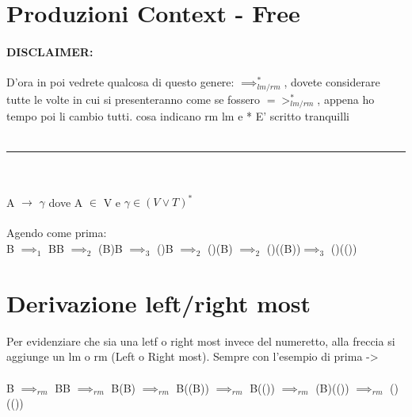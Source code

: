 \documentclass[12pt, a4paper, openany, oneside]{book}
\begin{document}
\section{Produzioni Context - Free}
\paragraph{DISCLAIMER: } D'ora in poi vedrete qualcosa di questo genere: 
$\implies^{*}_{lm/rm}$,
dovete considerare tutte le volte in cui si presenteranno come se fossero 
$=>^{*}_{lm/rm}$, appena ho tempo poi li cambio tutti. cosa indicano rm lm e *
E' scritto tranquilli \\
\\
{\color{black} \rule{\linewidth}{0.3mm}}
\\
\\
A $\to$ $\gamma$ dove A $\in$ V e $\gamma \in (V\vee T)^{*}$ \\ \\
Agendo come prima:	\\
B $\implies _{1}$ BB $\implies _{2}$ (B)B $\implies _{3}$ ()B $\implies _{2}$ 
()(B) $\implies _{2}$ ()((B))$\implies _{3}$ ()(())
\section{Derivazione left/right most}
Per evidenziare che sia una letf o right most invece del numeretto, alla freccia
si aggiunge un lm o rm (Left o Right most). Sempre con l'esempio di prima -> \\ \\
B $\implies _{rm}$ BB $\implies _{rm}$ B(B) $\implies _{rm}$ B((B)) 
$\implies _{rm}$ B(()) $\implies _{rm}$ (B)(()) $\implies _{rm}$ ()(())
\end{document}
